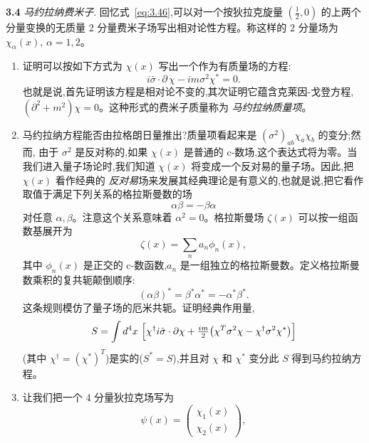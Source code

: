 \textbf{3.4} \emph{马约拉纳费米子}.  回忆式~\eqref{eq:3.46},可以对一个按狄拉克旋量 $(\tfrac{1}{2}, 0)$ 的上两个分量变换的无质量 2 分量费米子场写出相对论性方程。称这样的 2 分量场为 $\chi_\alpha(x)$,
$\alpha = 1, 2$。
\begin{enumerate}[label=(\alph*)]
  \item 证明可以按如下方式为 $\chi(x)$ 写出一个作为有质量场的方程:
    \begin{equation}
      i\bar{\sigma}\cdot\partial\,\chi - im\sigma^2\chi^{*} = 0 .
    \end{equation}
    也就是说,首先证明该方程是相对论不变的,其次证明它蕴含克莱因-戈登方程,
    $(\partial^2 + m^2)\chi = 0$。这种形式的费米子质量称为
    \emph{马约拉纳质量项}。
  \item 马约拉纳方程能否由拉格朗日量推出?质量项看起来是 $(\sigma^2)_{ab}\chi_a\chi_b$ 的变分;然而,
    由于 $\sigma^2$ 是反对称的,如果 $\chi(x)$ 是普通的 c-数场,这个表达式将为零。当我们进入量子场论时,我们知道 $\chi(x)$ 将变成一个反对易的量子场。因此,把 $\chi(x)$ 看作经典的 \emph{反对易}场来发展其经典理论是有意义的,也就是说,把它看作取值于满足下列关系的格拉斯曼数的场
    \begin{equation}
      \alpha\beta = -\beta\alpha
    \end{equation}
    对任意 $\alpha, \beta$。注意这个关系意味着
    $\alpha^2 = 0$。格拉斯曼场 $\zeta(x)$ 可以按一组函数基展开为
    \begin{equation}
      \zeta(x) = \sum_n a_n\phi_n(x),
    \end{equation}
    其中 $\phi_n(x)$ 是正交的 c-数函数,$a_n$ 是一组独立的格拉斯曼数。定义格拉斯曼数乘积的复共轭颠倒顺序:
    \begin{equation}
      (\alpha\beta)^{*} = \beta^{*}\alpha^{*} = -\alpha^{*}\beta^{*} .
    \end{equation}
    这条规则模仿了量子场的厄米共轭。证明经典作用量,
    \begin{equation}
      S = \int d^4x\ \Bigl[ \chi^{\dagger}i\bar{\sigma}\cdot\partial\chi
        + \tfrac{im}{2}\bigl( \chi^T\sigma^2\chi - \chi^{\dagger}\sigma^2
          \chi^{*} \bigr) \Bigr]
    \end{equation}
    (其中 $\chi^{\dagger} = (\chi^{*})^T$)是实的($S^{*} = S$),并且对 $\chi$ 和 $\chi^{*}$ 变分此 $S$ 得到马约拉纳方程。
  \item 让我们把一个 4 分量狄拉克场写为
    \begin{equation}
      \psi(x) = \begin{pmatrix}\chi_1(x)\\ \chi_2(x)\end{pmatrix},

\end{equation}
\end{enumerate}
